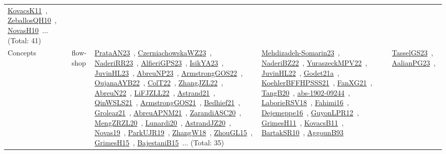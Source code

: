 {\begin{longtable}{lp{3cm}>{\raggedright\arraybackslash}p{6cm}>{\raggedright\arraybackslash}p{6cm}>{\raggedright\arraybackslash}p{8cm}}
\href{works/KovacsK11.pdf}{KovacsK11}~\cite{KovacsK11}, \href{works/ZeballosQH10.pdf}{ZeballosQH10}~\cite{ZeballosQH10}, \href{works/NovasH10.pdf}{NovasH10}~\cite{NovasH10}... (Total: 41)\\
Concepts & flow-shop & \href{works/PrataAN23.pdf}{PrataAN23}~\cite{PrataAN23}, \href{works/CzerniachowskaWZ23.pdf}{CzerniachowskaWZ23}~\cite{CzerniachowskaWZ23}, \href{works/NaderiRR23.pdf}{NaderiRR23}~\cite{NaderiRR23}, \href{works/AlfieriGPS23.pdf}{AlfieriGPS23}~\cite{AlfieriGPS23}, \href{works/IsikYA23.pdf}{IsikYA23}~\cite{IsikYA23}, \href{works/JuvinHL23.pdf}{JuvinHL23}~\cite{JuvinHL23}, \href{works/AbreuNP23.pdf}{AbreuNP23}~\cite{AbreuNP23}, \href{works/ArmstrongGOS22.pdf}{ArmstrongGOS22}~\cite{ArmstrongGOS22}, \href{works/OujanaAYB22.pdf}{OujanaAYB22}~\cite{OujanaAYB22}, \href{works/ColT22.pdf}{ColT22}~\cite{ColT22}, \href{works/ZhangJZL22.pdf}{ZhangJZL22}~\cite{ZhangJZL22}, \href{works/AbreuN22.pdf}{AbreuN22}~\cite{AbreuN22}, \href{works/LiFJZLL22.pdf}{LiFJZLL22}~\cite{LiFJZLL22}, \href{works/Astrand21.pdf}{Astrand21}~\cite{Astrand21}, \href{works/QinWSLS21.pdf}{QinWSLS21}~\cite{QinWSLS21}, \href{works/ArmstrongGOS21.pdf}{ArmstrongGOS21}~\cite{ArmstrongGOS21}, \href{works/Bedhief21.pdf}{Bedhief21}~\cite{Bedhief21}, \href{works/Groleaz21.pdf}{Groleaz21}~\cite{Groleaz21}, \href{works/AbreuAPNM21.pdf}{AbreuAPNM21}~\cite{AbreuAPNM21}, \href{works/ZarandiASC20.pdf}{ZarandiASC20}~\cite{ZarandiASC20}, \href{works/MengZRZL20.pdf}{MengZRZL20}~\cite{MengZRZL20}, \href{works/Lunardi20.pdf}{Lunardi20}~\cite{Lunardi20}, \href{works/AstrandJZ20.pdf}{AstrandJZ20}~\cite{AstrandJZ20}, \href{works/Novas19.pdf}{Novas19}~\cite{Novas19}, \href{works/ParkUJR19.pdf}{ParkUJR19}~\cite{ParkUJR19}, \href{works/ZhangW18.pdf}{ZhangW18}~\cite{ZhangW18}, \href{works/ZhouGL15.pdf}{ZhouGL15}~\cite{ZhouGL15}, \href{works/GrimesH15.pdf}{GrimesH15}~\cite{GrimesH15}, \href{works/BajestaniB15.pdf}{BajestaniB15}~\cite{BajestaniB15}... (Total: 35) & \href{works/Mehdizadeh-Somarin23.pdf}{Mehdizadeh-Somarin23}~\cite{Mehdizadeh-Somarin23}, \href{works/NaderiBZ22.pdf}{NaderiBZ22}~\cite{NaderiBZ22}, \href{works/YuraszeckMPV22.pdf}{YuraszeckMPV22}~\cite{YuraszeckMPV22}, \href{works/JuvinHL22.pdf}{JuvinHL22}~\cite{JuvinHL22}, \href{works/Godet21a.pdf}{Godet21a}~\cite{Godet21a}, \href{works/KoehlerBFFHPSSS21.pdf}{KoehlerBFFHPSSS21}~\cite{KoehlerBFFHPSSS21}, \href{works/FanXG21.pdf}{FanXG21}~\cite{FanXG21}, \href{works/TangB20.pdf}{TangB20}~\cite{TangB20}, \href{works/abs-1902-09244.pdf}{abs-1902-09244}~\cite{abs-1902-09244}, \href{works/LaborieRSV18.pdf}{LaborieRSV18}~\cite{LaborieRSV18}, \href{works/Fahimi16.pdf}{Fahimi16}~\cite{Fahimi16}, \href{works/Dejemeppe16.pdf}{Dejemeppe16}~\cite{Dejemeppe16}, \href{works/GuyonLPR12.pdf}{GuyonLPR12}~\cite{GuyonLPR12}, \href{works/GrimesH11.pdf}{GrimesH11}~\cite{GrimesH11}, \href{works/KovacsB11.pdf}{KovacsB11}~\cite{KovacsB11}, \href{works/BartakSR10.pdf}{BartakSR10}~\cite{BartakSR10}, \href{works/AggounB93.pdf}{AggounB93}~\cite{AggounB93} & \href{works/TasselGS23.pdf}{TasselGS23}~\cite{TasselGS23}, \href{works/AalianPG23.pdf}{AalianPG23}~\cite{AalianPG23}, 
\end{longtable}}
